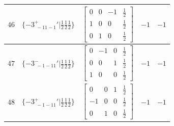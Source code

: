 \documentclass[fleqn,8pt]{jsarticle}
\begin{document}
\begin{longtable}{ccccc}
$ 46 $ & $ \{-3^{+}_{\,\,-11-1}{}'|\frac{1}{2} \frac{1}{2} \frac{1}{2}\} $ & $ \begin{bmatrix} 0 & 0 & -1 & \frac{1}{2} \\ 1 & 0 & 0 & \frac{1}{2} \\ 0 & 1 & 0 & \frac{1}{2} \end{bmatrix} $ & $ -1 $ & $ -1 $ \\ \hline
$ 47 $ & $ \{-3^{-}_{\,\,-1-11}{}'|\frac{1}{2} \frac{1}{2} \frac{1}{2}\} $ & $ \begin{bmatrix} 0 & -1 & 0 & \frac{1}{2} \\ 0 & 0 & 1 & \frac{1}{2} \\ 1 & 0 & 0 & \frac{1}{2} \end{bmatrix} $ & $ -1 $ & $ -1 $ \\ \hline
$ 48 $ & $ \{-3^{+}_{\,\,-1-11}{}'|\frac{1}{2} \frac{1}{2} \frac{1}{2}\} $ & $ \begin{bmatrix} 0 & 0 & 1 & \frac{1}{2} \\ -1 & 0 & 0 & \frac{1}{2} \\ 0 & 1 & 0 & \frac{1}{2} \end{bmatrix} $ & $ -1 $ & $ -1 $ \\
\end{longtable}
\end{document}
